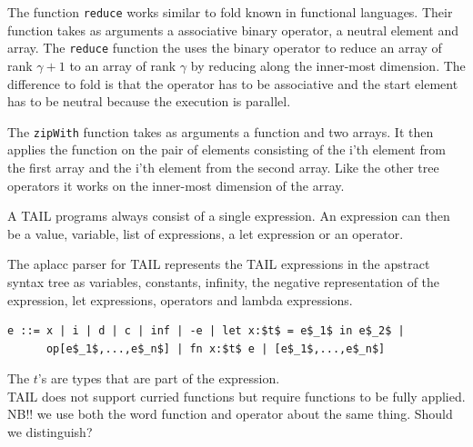 \documentclass[11pt]{article}
\begin{document}
The function {\tt reduce} works similar to fold known in functional languages.
Their function takes as arguments a associative binary operator, a neutral element and array.
The {\tt reduce} function the uses the binary operator 
to reduce an array of rank $\gamma+1$ to an array of rank $\gamma$ by reducing along the inner-most dimension.
The difference to fold is that the operator has to be associative and the start element has to be neutral
because the execution is parallel.

The {\tt zipWith} function takes as arguments a function and two arrays.
It then applies the function on the pair of elements consisting of the i'th element
from the first array and the i'th element from the second array.
Like the other tree operators it works on the inner-most dimension of the array\cite{ElsmanDybdal:Array:2014}.

A TAIL programs always consist of a single expression. An expression can then be a value, variable, 
list of expressions, a let expression or an operator.

The aplacc parser for TAIL represents the TAIL expressions in the apstract syntax tree as variables, constants, infinity, the negative representation of 
the expression, let expressions, operators and lambda expressions. 
\begin{lstlisting}[numbers=none,frame=none]
e ::= x | i | d | c | inf | -e | let x:$t$ = e$_1$ in e$_2$ |
      op[e$_1$,...,e$_n$] | fn x:$t$ e | [e$_1$,...,e$_n$]
\end{lstlisting}

The $t$'s are types that are part of the expression. \\

TAIL does not support curried functions but require functions to be fully applied.\\

NB!! we use both the word function and operator about the same thing. Should we distinguish?







\end{document}
